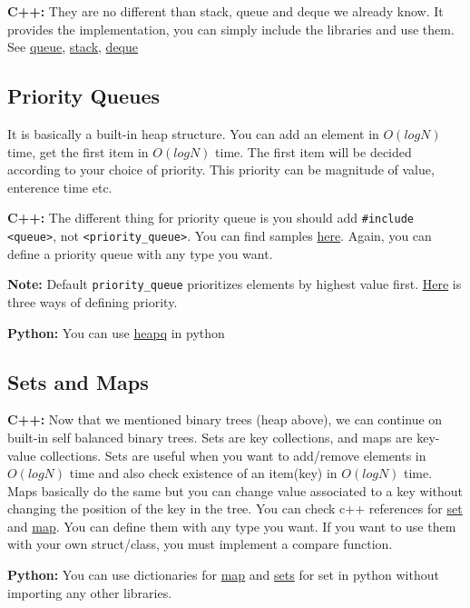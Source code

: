 \documentclass[12pt]{article}
\begin{document}
\textbf{C++:} They are no different than stack, queue and deque we already know. It provides the implementation, you can simply include the libraries and use them. See \href{http://www.cplusplus.com/reference/queue/queue/}{queue}, \href{http://www.cplusplus.com/reference/stack/stack/}{stack}, \href{http://www.cplusplus.com/reference/deque/deque/}{deque}

\subsection{Priority Queues}
It is basically a built-in heap structure. You can add an element in $O(logN)$ time, get the first item in $O(logN)$ time. The first item will be decided according to your choice of priority. This priority can be magnitude of value, enterence time etc.

\textbf{C++: } The different thing for priority queue is you should add  \lstinline{#include <queue>}, not \lstinline{<priority_queue>}. You can find samples \href{http://www.cplusplus.com/reference/queue/priority_queue/}{here}. Again, you can define a priority queue with any type you want.

\textbf{Note:} Default \lstinline{priority_queue} prioritizes elements by highest value first. \href{https://en.cppreference.com/w/cpp/container/priority_queue}{Here} is three ways of defining priority.

\textbf{Python: } You can use \href{https://docs.python.org/2/library/heapq.html}{heapq} in python

\subsection{Sets and Maps}
\textbf{C++:} Now that we mentioned binary trees (heap above), we can continue on built-in self balanced binary trees. Sets are key collections, and maps are key-value collections. Sets are useful when you want to add/remove elements in $O(logN)$ time and also check existence of an item(key) in $O(logN)$ time. Maps basically do the same but you can change value associated to a key without changing the position of the key in the tree. You can check c++ references for \href{http://www.cplusplus.com/reference/set/set/}{set} and \href{http://www.cplusplus.com/reference/map/map/map/}{map}. You can define them with any type you want. If you want to use them with your own struct/class, you must implement a compare function.

\textbf{Python:} You can use dictionaries for \href{https://docs.python.org/3/tutorial/datastructures.html#dictionaries}{map} and \href{https://docs.python.org/3/tutorial/datastructures.html#sets}{sets} for set in python without importing any other libraries.
\end{document}
